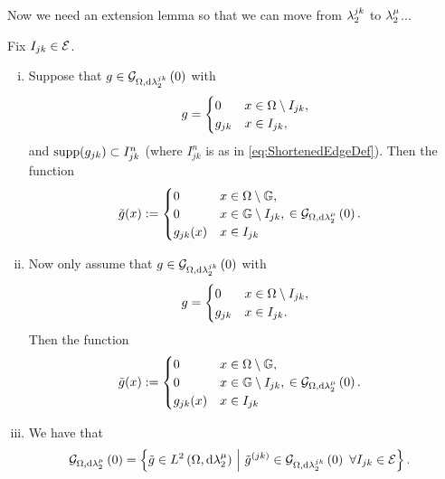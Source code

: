 Now we need an extension lemma so that we can move from $\lambda_2^{jk}$ to $\lambda_2^{\mu}$...
\begin{prop} \label{prop:SI-GradZeroExtension}
	Fix $I_{jk}\in\mathcal{E}$.
	\begin{enumerate}[(i)]
		\item Suppose that $g\in\mathcal{G}_{ \Omega, \mathrm{d}\lambda_2^{jk}}\left( 0 \right)$ with
		\begin{align*}
			g = \begin{cases} 0 & x\in\Omega\setminus I_{jk}, \\ g_{jk} & x\in I_{jk}, \end{cases}
		\end{align*}
		and $\mathrm{supp}(g_{jk})\subset I_{jk}^n$ (where $I_{jk}^n$ is as in \eqref{eq:ShortenedEdgeDef}).
		Then the function
		\begin{align*}
			\tilde{g}(x) &:= \begin{cases} 0 & x\in\Omega\setminus\mathbb{G}, \\ 0 & x\in\mathbb{G}\setminus I_{jk}, \\ g_{jk}(x) & x\in I_{jk} \end{cases}
			\in\mathcal{G}_{ \Omega, \mathrm{d}\lambda_2^{\mu}}\left( 0 \right).
		\end{align*}
		\item Now only assume that $g\in\mathcal{G}_{ \Omega, \mathrm{d}\lambda_2^{jk}}\left( 0 \right)$ with
		\begin{align*}
			g = \begin{cases} 0 & x\in\Omega\setminus I_{jk}, \\ g_{jk} & x\in I_{jk}. \end{cases}
		\end{align*}
		Then the function
		\begin{align*}
			\tilde{g}(x) &:= \begin{cases} 0 & x\in\Omega\setminus\mathbb{G}, \\ 0 & x\in\mathbb{G}\setminus I_{jk}, \\ g_{jk}(x) & x\in I_{jk} \end{cases}
			\in\mathcal{G}_{ \Omega, \mathrm{d}\lambda_2^{\mu}}\left( 0 \right).
		\end{align*}
		\item We have that
		\begin{align*}
			\mathcal{G}_{ \Omega, \mathrm{d}\lambda_2^{\mu}}\left( 0 \right) &= \left\{  \tilde{g}\in L^{2}\left( \Omega,\mathrm{d} \lambda_2^{\mu} \right) \ \middle\vert \  \tilde{g}^{(jk)}\in\mathcal{G}_{ \Omega, \mathrm{d}\lambda_2^{jk}}\left( 0 \right) \ \forall I_{jk}\in\mathcal{E}  \right\}.
		\end{align*}
	\end{enumerate}
\end{prop}

